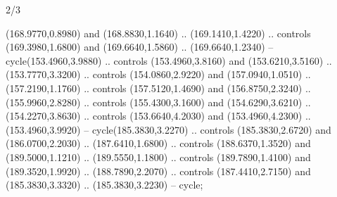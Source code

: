 \begin{flagdescription}{2/3}
\begin{scope}[xshift=0.5\flaglength,yshift=0.5\flagwidth,scale=\stretchfactor]
\begin{scope}[scale=0.001645\flagwidth,yshift=65mm,xshift=-63mm]
\begin{scope}[y=0.80pt, x=0.80pt, yscale=-1,]
\begin{scope}[cm={{1.33333,0.0,0.0,1.33333,(0.0,1e-05)}}]
  (168.9770,0.8980) and (168.8830,1.1640) .. (169.1410,1.4220) .. controls
  (169.3980,1.6800) and (169.6640,1.5860) .. (169.6640,1.2340) --
  cycle(153.4960,3.9880) .. controls (153.4960,3.8160) and (153.6210,3.5160) ..
  (153.7770,3.3200) .. controls (154.0860,2.9220) and (157.0940,1.0510) ..
  (157.2190,1.1760) .. controls (157.5120,1.4690) and (156.8750,2.3240) ..
  (155.9960,2.8280) .. controls (155.4300,3.1600) and (154.6290,3.6210) ..
  (154.2270,3.8630) .. controls (153.6640,4.2030) and (153.4960,4.2300) ..
  (153.4960,3.9920) -- cycle(185.3830,3.2270) .. controls (185.3830,2.6720) and
  (186.0700,2.2030) .. (187.6410,1.6800) .. controls (188.6370,1.3520) and
  (189.5000,1.1210) .. (189.5550,1.1800) .. controls (189.7890,1.4100) and
  (189.3520,1.9920) .. (188.7890,2.2070) .. controls (187.4410,2.7150) and
  (185.3830,3.3320) .. (185.3830,3.2230) -- cycle;
\end{scope}
\end{scope}
\end{scope}
\end{scope}
\fi
\framecode{}
\end{flagdescription}

